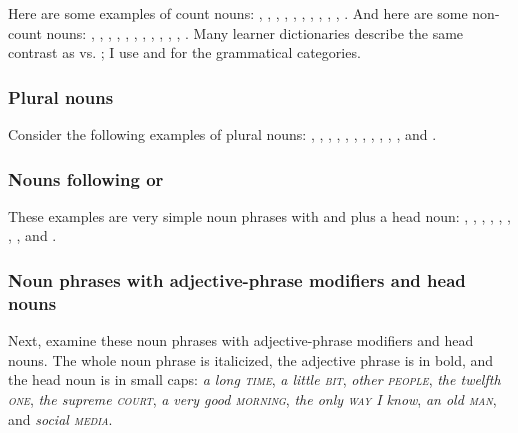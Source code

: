 Here are some examples of count nouns: , , , , , , , , , , . And here are some non-count nouns: , , , , , , , , , , , . Many learner dictionaries describe the same contrast as  vs. ; I use  and  for the grammatical categories.

\subsubsection*{Plural nouns}
Consider the following examples of plural nouns: , , , , , , , , , , , and .

\subsubsection*{Nouns following  or }
These examples are very simple noun phrases with  and  plus a head noun: , , , , , , , , and .

\subsubsection*{Noun phrases with adjective-phrase modifiers and head nouns}
Next, examine these noun phrases with adjective-phrase modifiers and head nouns. The whole noun phrase is italicized, the adjective phrase is in bold, and the head noun is in small caps: \textit{a \emph{long} \textsc{time}}, \textit{a \emph{little} \textsc{bit}}, \textit{\emph{other} \textsc{people}}, \textit{the \emph{twelfth} \textsc{one}}, \textit{the \emph{supreme} \textsc{court}}, \textit{a \emph{very good} \textsc{morning}}, \textit{the \emph{only} \textsc{way} I know}, \textit{an \emph{old} \textsc{man}}, and \textit{\emph{social} \textsc{media}}.

